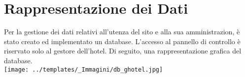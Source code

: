 \section{Rappresentazione dei Dati}
Per la gestione dei dati relativi all'utenza del sito e alla sua amministrazion, è stato creato ed implementato un database. L'accesso al pannello di controllo è riservato solo al gestore dell'hotel.
Di seguito, una rappresentazione grafica del database.\\
\vspace{3cm}
\texttt{[image: ../templates/\_Immagini/db\_ghotel.jpg]}